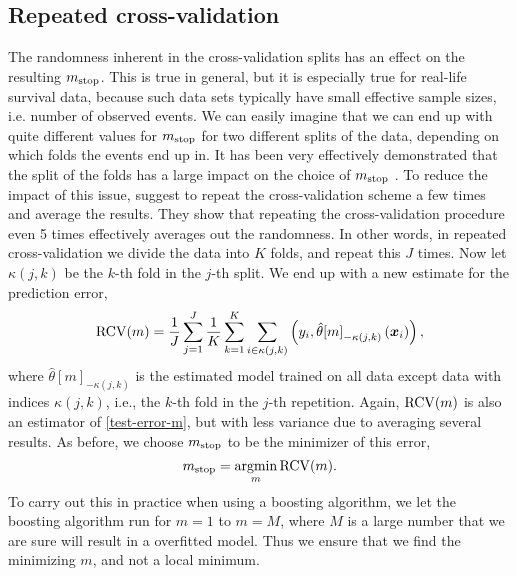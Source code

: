 \subsection{Repeated cross-validation}\label{subsec:repeated-cv}
The randomness inherent in the cross-validation splits has an effect on the resulting $m_{\text{stop}}$.
This is true in general, but it is especially true for real-life survival data, because such data sets typically have small effective sample sizes, i.e. number of observed events.
We can easily imagine that we can end up with quite different values for $m_{\text{stop}}$ for two different splits of the data, depending on which folds the events end up in.
It has been very effectively demonstrated that the split of the folds has a large impact on the choice of $m_{\text{stop}}$ \citep{seibold}.
To reduce the impact of this issue, \citet{seibold} suggest to repeat the cross-validation scheme a few times and average the results.
They show that repeating the cross-validation procedure even 5 times effectively averages out the randomness.
In other words, in repeated cross-validation we divide the data into $K$ folds, and repeat this $J$ times.
Now let $\kappa(j, k)$ be the $k$-th fold in the $j$-th split.
We end up with a new estimate for the prediction error,
\begin{equation*}
    \operatorname{RCV}(m)=\frac{1}{J}\sum_{j=1}^J\frac{1}{K}\sum_{k=1}^K\sum_{i\in\kappa(j,k)}\left(y_i,\hat{\theta}{[m]}_{-\kappa(j,k)}\left(\bm{x}_i\right)\right),
\end{equation*}
where $\hat{\theta}{[m]}_{-\kappa(j, k)}$ is the estimated model trained on all data except data with indices $\kappa(j, k)$, i.e., the $k$-th fold in the $j$-th repetition.
Again, $\operatorname{RCV}(m)$ is also an estimator of \eqref{test-error-m}, but with less variance due to averaging several results.
As before, we choose $m_{\text{stop}}$ to be the minimizer of this error,
\begin{equation*}
    m_{\text{stop}}=\operatorname*{argmin}_{m}\operatorname{RCV}(m).
\end{equation*}
To carry out this in practice when using a boosting algorithm, we let the boosting algorithm run for $m=1$ to $m=M$, where $M$ is a large number that we are sure will result in a overfitted model.
Thus we ensure that we find the minimizing $m$, and not a local minimum.

